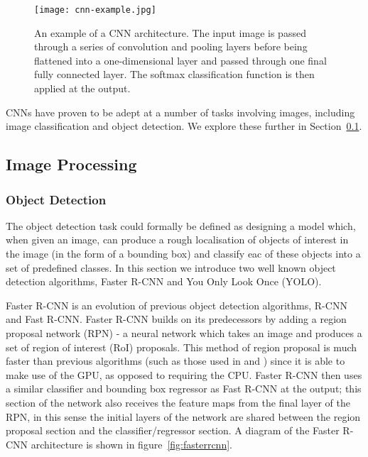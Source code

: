 \documentclass[../interim.tex]{subfiles}
\begin{document}
\begin{figure}
  \centering
  \texttt{[image: cnn-example.jpg]}
  \caption{An example of a CNN architecture. The input image is passed through a series of convolution and pooling layers before being flattened into a one-dimensional layer and passed through one final fully connected layer. The softmax classification function is then applied at the output.}
  \label{fig:example-cnn}
\end{figure}

CNNs have proven to be adept at a number of tasks involving images, including image classification\cite{cnn-uses:classification} and object detection\cite{cnn-uses:yolo-v3}\cite{cnn-uses:faster-r-cnn}. We explore these further in Section~\ref{section:image-proc}.


\subsection{Image Processing}
\label{section:image-proc}

\subsubsection{Object Detection}

The object detection task could formally be defined as designing a model which, when given an image, can produce a rough localisation of objects of interest in the image (in the form of a bounding box) and classify eac of these objects into a set of predefined classes. In this section we introduce two well known object detection algorithms, Faster R-CNN\cite{cnn-uses:faster-r-cnn} and You Only Look Once (YOLO)\cite{cnn-uses:yolo-v3}.

Faster R-CNN is an evolution of previous object detection algorithms, R-CNN\cite{r-cnn} and Fast R-CNN\cite{fast-r-cnn}. Faster R-CNN builds on its predecessors by adding a region proposal network (RPN) - a neural network which takes an image and produces a set of region of interest (RoI) proposals. This method of region proposal is much faster than previous algorithms (such as those used in \cite{r-cnn} and \cite{fast-r-cnn}) since it is able to make use of the GPU, as opposed to requiring the CPU. Faster R-CNN then uses a similar classifier and bounding box regressor as Fast R-CNN at the output; this section of the network also receives the feature maps from the final layer of the RPN, in this sense the initial layers of the network are shared between the region proposal section and the classifier/regressor section. A diagram of the Faster R-CNN architecture is shown in figure~\ref{fig:fasterrcnn}.
\end{document}
